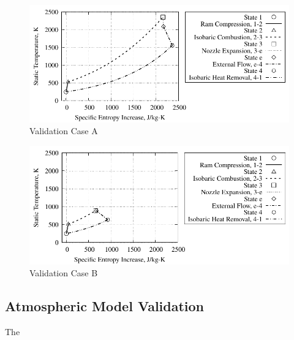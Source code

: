 \documentclass[conf]{new-aiaa} %
\begin{document}
\begin{figure}[hbt!] %
    \centering
    \includegraphics[]{media/ts_plot_files/TS_plot_for_case_7.pdf}
    \caption{\label{fig:partavalida}Validation Case A}
\end{figure}

\begin{figure}[hbt!] %
    \centering
    \includegraphics[]{media/ts_plot_files/TS_plot_for_case_8.pdf}
    \caption{\label{fig:partavalidb}Validation Case B}
\end{figure}

\subsection{Atmospheric Model Validation} %
The \cite{nasa1976standardatmos}
\end{document}
